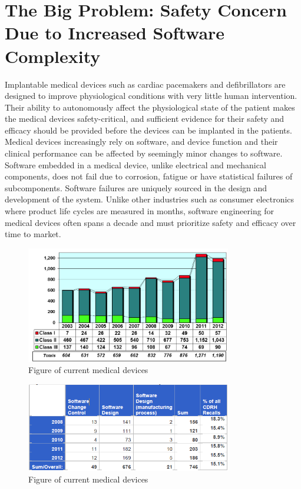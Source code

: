 \section{The Big Problem: Safety Concern Due to Increased Software Complexity}
Implantable medical devices such as cardiac pacemakers and defibrillators are designed to improve physiological conditions with very little human intervention. 
Their ability to autonomously affect the physiological state of the patient makes the medical devices safety-critical, and sufficient evidence for their safety and efficacy should be provided before the devices can be implanted in the patients. Medical devices increasingly rely on software, and device function and their clinical performance can be affected by seemingly minor changes to software. Software embedded in a medical device, unlike electrical and mechanical components, does not fail due to corrosion, fatigue or have statistical failures of subcomponents. Software failures are uniquely sourced in the design and development of the system. Unlike other industries such as consumer electronics where product life cycles are measured in months, software engineering for medical devices often spans a decade and must prioritize safety and efficacy over time to market. 
\begin{figure}[t]
		\centering
		\includegraphics[width=0.8\textwidth]{figs/recalls.jpg}
		\caption{\small Figure of current medical devices}
		\label{fig:Cur}
\end{figure}
\begin{figure}[t]
		\centering
		\includegraphics[width=0.8\textwidth]{figs/soft_recalls.jpg}
		\caption{\small Figure of current medical devices}
		\label{fig:Cur}
\end{figure}
